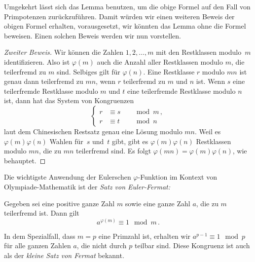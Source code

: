 Umgekehrt lässt sich das Lemma benutzen, um die obige Formel auf den Fall von Primpotenzen zurückzuführen. Damit würden wir einen weiteren Beweis der obigen Formel erhalten, vorausgesetzt, wir könnten das Lemma ohne die Formel beweisen. Einen solchen Beweis werden wir nun vorstellen.

\begin{proof}[Zweiter Beweis]
	Wir können die Zahlen $1,2,\dotsc,m$ mit den Restklassen modulo~$m$ identifizieren. Also ist $\varphi(m)$ auch die Anzahl aller Restklassen modulo $m$, die teilerfremd zu $m$ sind. Selbiges gilt für $\varphi(n)$. Eine Restklasse $r$ modulo $mn$ ist genau dann teilerfremd zu $mn$, wenn $r$ teilerfremd zu $m$ und $n$ ist. Wenn $s$ eine teilerfremde Restklasse modulo $m$ und $t$ eine teilerfremde Restklasse modulo $n$ ist, dann hat das System von Kongruenzen
	\begin{equation*}
		\left\{\begin{alignedat}{2}
			r&\equiv s&&\mod m\,,\\
			r&\equiv t&&\mod n
		\end{alignedat}\right.
	\end{equation*}
	laut dem Chinesischen Restsatz genau eine Lösung modulo $mn$. Weil es $\varphi(m)\varphi(n)$ Wahlen für~$s$ und~$t$ gibt, gibt es $\varphi(m)\varphi(n)$ Restklassen modulo $mn$, die zu $mn$ teilerfremd sind. Es folgt $\varphi(mn)=\varphi(m)\varphi(n)$, wie behauptet.
\end{proof}

Die wichtigste Anwendung der Eulerschen $\varphi$-Funktion im Kontext von Olympiade-Mathematik ist der \emph{Satz von Euler-Fermat:}
\begin{satzmitnamen}
	Gegeben sei eine positive ganze Zahl $m$ sowie eine ganze Zahl $a$, die zu $m$ teilerfremd ist. Dann gilt
	\begin{equation*}
		a^{\varphi(m)}\equiv 1\mod m\,.
	\end{equation*}
\end{satzmitnamen}
In dem Spezialfall, dass $m=p$ eine Primzahl ist, erhalten wir $a^{p-1}\equiv 1\mod p$ für alle ganzen Zahlen $a$, die nicht durch $p$ teilbar sind. Diese Kongruenz ist auch als der \emph{kleine Satz von Fermat} bekannt.

